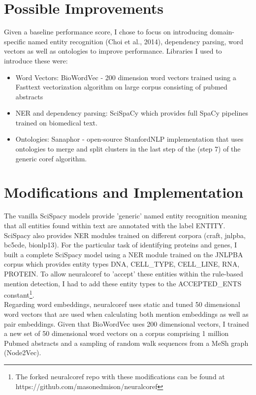 \documentclass[11pt]{article}
\begin{document}
\section{Possible Improvements}
Given a baseline performance score, I chose to focus on introducing domain-specific named entity recognition (Choi et al., 2014), dependency parsing, word vectors as well as ontologies to improve performance. Libraries I used to introduce these were: 
\begin{itemize}
    \item Word Vectors: BioWordVec - 200 dimension word vectors trained using a Fasttext vectorization algorithm on large corpus consisting of pubmed abstracts
    \item NER and dependency parsing: SciSpaCy which provides full SpaCy pipelines trained on biomedical text. 
    \item Ontologies: Sanaphor - open-source StanfordNLP implementation that uses ontologies to merge and split clusters in the last step of the (step 7) of the generic coref algorithm.
    \end{itemize}

\section{Modifications and Implementation}
The vanilla SciSpacy models provide 'generic' named entity recognition meaning that all entities found within text are annotated with the label ENTITY. SciSpacy also provides NER modules trained on different corpora (craft, jnlpba, bc5cde, bionlp13). For the particular task of identifying proteins and genes, I built a complete SciSpacy model using a NER module trained on the JNLPBA corpus which provides entity types DNA, CELL\_TYPE, CELL\_LINE, RNA, PROTEIN. To allow neuralcoref to 'accept' these entities within the rule-based mention detection, I had to add these entity types to the ACCEPTED\_ENTS constant\footnote{The forked neuralcoref repo with these modifications can be found at https://github.com/masonedmison/neuralcoref}. \\

Regarding word embeddings, neuralcoref uses static and tuned 50 dimensional word vectors that are used when calculating both mention embeddings as well as pair embeddings. Given that BioWordVec uses 200 dimensional vectors, I trained a new set of 50 dimensional word vectors on a corpus comprising 1 million Pubmed abstracts and a sampling of random walk sequences from a MeSh graph (Node2Vec). \\
\end{document}
